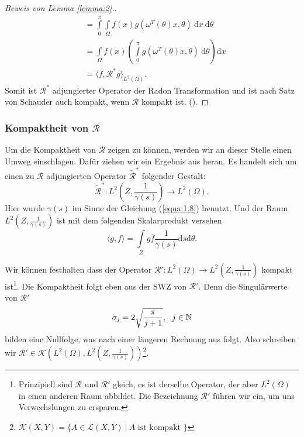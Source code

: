 \begin{proof}[Beweis von Lemma \ref{lemma:2}.]
\begin{equation}
\begin{split}
		& = \int\limits_{0}^{\pi} \int\limits_{\Omega} f(x) g(\omega^T(\theta)x,\theta) \ \mbox{d}x \ \mbox{d}\theta \\
		& = \int\limits_{\Omega} f(x) \left( \int\limits_{0}^{\pi} g(\omega^T(\theta)x,\theta) \ \mbox{d}\theta \right) \mbox{d}x  \\  
		& =\langle f, \mathcal{R^*} g \rangle_{L^2(\Omega)}.
	\end{split}
	\label{equa:1.24}
\end{equation}	 
Somit ist $\mathcal{R^*}$ adjungierter Operator der Radon Transformation und ist nach Satz von Schauder auch kompakt, wenn $\mathcal{R}$ kompakt ist. (\cite[S. 185]{Heuser75}).	 
\end{proof}

\subsubsection{Kompaktheit von $\mathcal{R}$}

Um die Kompaktheit von $\mathcal{R}$ zeigen zu können, werden wir an dieser Stelle einen Umweg einschlagen. Dafür ziehen wir ein Ergebnis aus \cite[S. 45]{Rieder03} heran. Es handelt sich um einen zu $\mathcal{R}$ adjungierten Operator $\tilde{\mathcal{R}}^*$ folgender Gestalt:
\begin{equation}
	\tilde{\mathcal{R}}^* : L^2(Z, \frac{1}{\gamma(s)}) \rightarrow L^2(\Omega).
	\label{equa:1.25}
\end{equation}
Hier wurde $\gamma(s)$ im Sinne der Gleichung (\ref{equa:1.8}) benutzt. Und der Raum $L^2(Z,\frac{1}{\gamma(s)})$ ist mit dem folgenden Skalarprodukt versehen
\begin{equation}
	\langle g,f \rangle = \int\limits_{Z} g \overline{f}\frac{1}{\gamma(s)}\mbox{d}s \mbox{d}\theta.
	\label{equa:1.26}
\end{equation}

Wir können festhalten dass der Operator $\mathcal{R'}:L^2(\Omega) \rightarrow  L^2(Z, \frac{1}{\gamma(s)})$ kompakt ist\footnote{Prinzipiell sind $\mathcal{R}$ und $\mathcal{R'}$ gleich, es ist derselbe Operator, der aber $L^2(\Omega)$ in einen anderen Raum abbildet. Die Bezeichnung $\mathcal{R}'$ führen wir ein, um uns Verwechslungen zu ersparen.}. Die Kompaktheit folgt eben aus der SWZ von $\mathcal{R}'$. Denn die Singulärwerte von $\mathcal{R}'$
\[
\sigma_j = 2\sqrt{\frac{\pi}{j + 1}}, \ \ j \in \mathbb{N}
\]
bilden eine Nullfolge, was nach einer längeren Rechnung aus \cite[S. 43]{Rieder03} folgt. Also schreiben wir $\mathcal{R}' \in \mathscr{K}(L^2(\Omega), L^2(Z,\frac{1}{\gamma(s)}))$\footnote{\label{foot:7}$\mathscr{K}(X,Y) = \{ A \in \mathscr{L}(X,Y) \ | \ A \mbox{ ist kompakt } \}$ }. 

